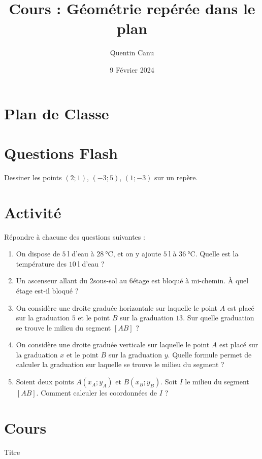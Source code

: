 \documentclass{article}
\title{Cours : Géométrie repérée dans le plan}
\date{9 Février 2024}
\author{Quentin Canu}
\begin{document}
\maketitle
\section{Plan de Classe}
\section{Questions Flash}
Dessiner les points $(2;1)$, $(-3;5)$, $(1;-3)$ sur un repère.
\section{Activité}
Répondre à chacune des questions suivantes :
\begin{enumerate}
\item On dispose de $\qty{5}{\litre}$ d'eau à $\qty{28}{\degreeCelsius}$, et on y ajoute $\qty{5}{\litre}$ à $\qty{36}{\degreeCelsius}$. Quelle est la température des $\qty{10}{\litre}$ d'eau ?
\item Un ascenseur allant du 2\ieme sous-sol au 6\ieme étage est bloqué à mi-chemin. À quel étage est-il bloqué ?
\item On considère une droite graduée horizontale sur laquelle le point $A$ est placé sur la graduation $5$ et le point $B$ sur la graduation $13$. Sur quelle graduation se trouve le milieu du segment $[AB]$ ?
\item On considère une droite graduée verticale sur laquelle le point $A$ est placé sur la graduation $x$ et le point $B$ sur la graduation $y$. Quelle formule permet de calculer la graduation sur laquelle se trouve le milieu du segment ?
\item Soient deux points $A(x_A;y_A)$ et $B(x_B;y_B)$. Soit $I$ le milieu du segment $[AB]$. Comment calculer les coordonnées de $I$ ?
\end{enumerate}
\section{Cours}
Titre
\end{document}
